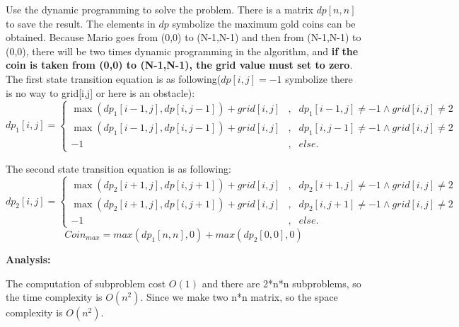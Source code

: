 Use the dynamic programming to solve the problem. There is a matrix $dp[n,n]$ to save the result. The elements in $dp$ symbolize the maximum gold coins can be obtained. Because Mario goes from (0,0) to (N-1,N-1) and then from (N-1,N-1) to (0,0), there will be two times dynamic programming in the algorithm, and \textbf{if the coin is taken from (0,0) to (N-1,N-1), the grid value must set to zero}. The first state transition equation is as following($dp[i,j]=-1$ symbolize there is no way to grid[i,j] or here is an obstacle):
\begin{equation}
	\label{eq6}
	dp_1[i,j]=\left\{
	\begin{aligned}
		\max(dp_1[i-1,j],dp[i,j-1]) + grid[i,j] & , & dp_1[i-1,j] \ne -1\wedge grid[i,j]\ne 2 \\
		\max(dp_1[i-1,j],dp[i,j-1]) + grid[i,j] & , & dp_1[i,j-1] \ne -1\wedge grid[i,j]\ne 2 \\
		-1 & , & else.
	\end{aligned}
	\right.
\end{equation}

The second state transition equation is as following:
\begin{equation}
	\label{eq6}
	dp_2[i,j]=\left\{
	\begin{aligned}
		\max(dp_2[i+1,j],dp[i,j+1]) + grid[i,j] & , & dp_2[i+1,j] \ne -1\wedge grid[i,j]\ne 2 \\
		\max(dp_2[i+1,j],dp[i,j+1]) + grid[i,j] & , & dp_2[i,j+1] \ne -1\wedge grid[i,j]\ne 2 \\
		-1 & , & else.
	\end{aligned}
	\right.
\end{equation}
$$Coin_{max} = max(dp_1[n,n],0)+max(dp_2[0,0],0)$$

\textbf{Analysis:}

The computation of subproblem cost $O(1)$ and there are 2*n*n subproblems, so the time complexity is $O(n^2)$. Since we make two n*n matrix, so the space complexity is $O(n^2)$.
